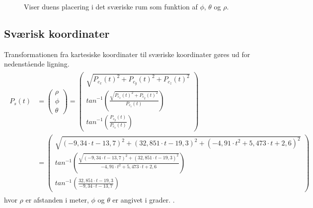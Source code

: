 \begin{figure}[!th]
\centering
\begin{tikzpicture}[scale=4]

\end{tikzpicture}
\caption[Sværisk koordinatsystem til koordinattransformation]{Viser duens placering i det sværiske rum som funktion af  \(\phi\), \(\theta\) og \(\rho\).}
\label{fig:thetaphi_degree}
\end{figure}


\subsection{Sværisk koordinater}
Transformationen fra kartesiske koordinater til sværiske koordinater gøres ud for nedenstående ligning.
\begin{align}
\begin{split}
{ P }_{ s }\left( t \right) &=\left( \begin{matrix} \rho  \\ \phi  \\ \theta  \end{matrix} \right) =\left( \begin{matrix} \sqrt { { { P }_{ c_x }\left( t \right) }^{ 2 }+{ { P }_{ c_y }\left( t \right) }^{ 2 }+{ { P }_{ c_z }\left( t \right) }^{ 2 } }  \\ { tan }^{ -1 }\left( \frac { \sqrt { { { P }_{ c_x }\left( t \right) }^{ 2 }+{ { P }_{ c_y }\left( t \right) }^{ 2 } }  }{ { P }_{ c_z }\left( t \right) }  \right)  \\ { tan }^{ -1 }\left( \frac { { P }_{ c_y }\left( t \right) }{ { P }_{ c_x }\left( t \right) }  \right)  \end{matrix} \right) 
\\
 &=\left( \begin{matrix} \sqrt { { \left( -9,34\cdot t-13,7 \right)  }^{ 2 }+{ \left( 32,851\cdot t-19,3 \right)  }^{ 2 }+{ \left( -{ 4,91\cdot t }^{ 2 }+5,473\cdot t+2,6 \right)  }^{ 2 } }  \\ { tan }^{ -1 }\left( \frac { \sqrt { { \left( -9,34\cdot t-13,7 \right)  }^{ 2 }+{ \left( 32,851\cdot t-19,3 \right)  }^{ 2 } }  }{  -{ 4,91\cdot t }^{ 2 }+5,473\cdot t+2,6 }  \right)  \\ { tan }^{ -1 }\left( \frac { 32,851\cdot t-19,3 }{ -9,34\cdot t-13,7 }  \right)  \end{matrix} \right) 
\label{eq:sv_koordi}
\end{split}
\end{align}
hvor \(\rho\) er afstanden i meter, \(\phi\) og \(\theta\) er angivet i grader. \citep[Kap. 10.6, s. 598]{adam}.
